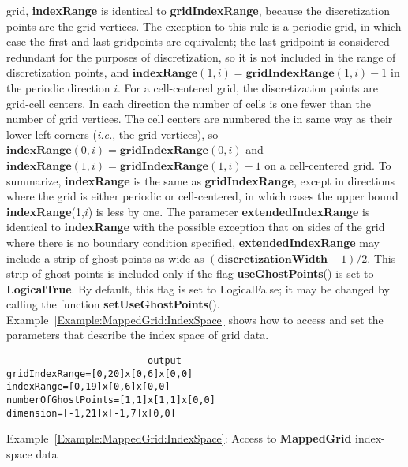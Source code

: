 \documentclass{article}
\begin{document}
grid, \textbf{indexRange} is identical to \textbf{gridIndexRange}, because the discretization points are the
grid vertices.  The exception to this rule is a periodic grid, in which case the first and last gridpoints are equivalent;
the last gridpoint is considered redundant for the purposes of discretization, so it is not
included in the range of discretization points, and $\textbf{indexRange}(1,i) = \textbf{gridIndexRange}(1,i)-1$ in the
periodic direction $i$.  For a cell-centered grid, the discretization points are grid-cell centers.  In each direction the
number of cells is one fewer than the number of grid vertices.  The cell centers are numbered the in same way as their
lower-left corners ({\em i.e.}, the grid vertices), so $\textbf{indexRange}(0,i) = \textbf{gridIndexRange}(0,i)$ and
$\textbf{indexRange}(1,i) = \textbf{gridIndexRange}(1,i)-1$ on a cell-centered grid.  To summarize,
\textbf{indexRange} is the same as \textbf{gridIndexRange}, except in directions where the grid is either periodic
or cell-centered, in which cases the upper bound \textbf{indexRange}(1,$i$) is less by one.  The parameter
\textbf{extendedIndexRange} is identical to \textbf{indexRange} with the possible exception that on sides of the grid
where there is no boundary condition specified, \textbf{extendedIndexRange} may include a strip of ghost points as wide
as $(\textbf{discretizationWidth}-1)/2$.  This strip of ghost points is included only if the flag
\textbf{useGhostPoints}() is set to \textbf{LogicalTrue}.  By default, this flag is set to LogicalFalse; it may be
changed by calling the function \textbf{setUseGhostPoints}().  Example~\ref{Example:MappedGrid:IndexSpace} shows how
to access and set the parameters that describe the index space of grid data.


{\small
{}
\begin{verbatim}
------------------------ output -----------------------
gridIndexRange=[0,20]x[0,6]x[0,0]
indexRange=[0,19]x[0,6]x[0,0]
numberOfGhostPoints=[1,1]x[1,1]x[0,0]
dimension=[-1,21]x[-1,7]x[0,0]
\end{verbatim}
}
{\center Example~\ref{Example:MappedGrid:IndexSpace}: Access to \textbf{MappedGrid} index-space data\label{Example:MappedGrid:IndexSpace}}
\end{document}
